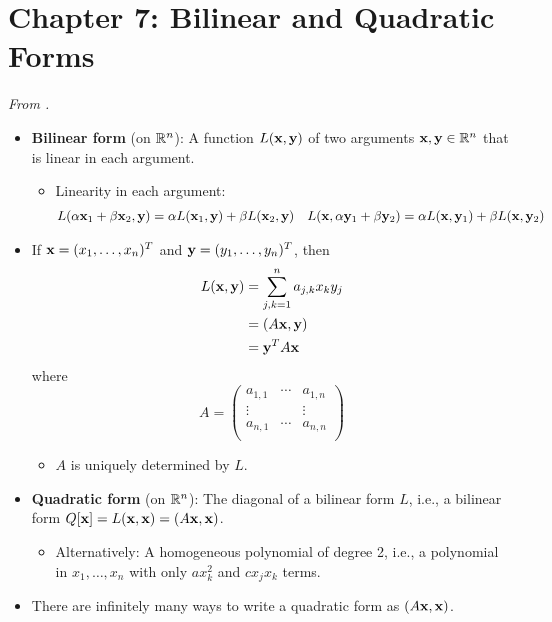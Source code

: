 \documentclass[../../notes.tex]{subfiles}
\begin{document}
\section{Chapter 7: Bilinear and Quadratic Forms}
\emph{From \textcite{bib:Treil}.}
\begin{itemize}
    \item {}\textbf{Bilinear form} (on $\mathbb{R}^n$): A function $L(\mathbf{x},\mathbf{y})$ of two arguments $\mathbf{x},\mathbf{y}\in\mathbb{R}^n$ that is linear in each argument.
    \begin{itemize}
        \item Linearity in each argument:
        \begin{align*}
            L(\alpha\mathbf{x}_1+\beta\mathbf{x}_2,\mathbf{y}) &= \alpha L(\mathbf{x}_1,\mathbf{y})+\beta L(\mathbf{x}_2,\mathbf{y})&
            L(\mathbf{x},\alpha\mathbf{y}_1+\beta\mathbf{y}_2) &= \alpha L(\mathbf{x},\mathbf{y}_1)+\beta L(\mathbf{x},\mathbf{y}_2)
        \end{align*}
    \end{itemize}
    \item If $\mathbf{x}=(x_1,\dots,x_n)^T$ and $\mathbf{y}=(y_1,\dots,y_n)^T$, then
    \begin{align*}
        L(\mathbf{x},\mathbf{y}) &= \sum_{j,k=1}^na_{j,k}x_ky_j\\
        &= (A\mathbf{x},\mathbf{y})\\
        &= \mathbf{y}^TA\mathbf{x}
    \end{align*}
    where
    \begin{equation*}
        A =
        \begin{pmatrix}
            a_{1,1} & \cdots & a_{1,n}\\
            \vdots &  & \vdots\\
            a_{n,1} & \cdots & a_{n,n}\\
        \end{pmatrix}
    \end{equation*}
    \begin{itemize}
        \item $A$ is uniquely determined by $L$.
    \end{itemize}
    \item \textbf{Quadratic form} (on $\mathbb{R}^n$): The diagonal of a bilinear form $L$, i.e., a bilinear form $Q[\mathbf{x}]=L(\mathbf{x},\mathbf{x})=(A\mathbf{x},\mathbf{x})$.
    \begin{itemize}
        \item Alternatively: A homogeneous polynomial of degree 2, i.e., a polynomial in $x_1,\dots,x_n$ with only $ax_k^2$ and $cx_jx_k$ terms.
    \end{itemize}
    \item There are infinitely many ways to write a quadratic form as $(A\mathbf{x},\mathbf{x})$.

\end{itemize}
\end{document}
